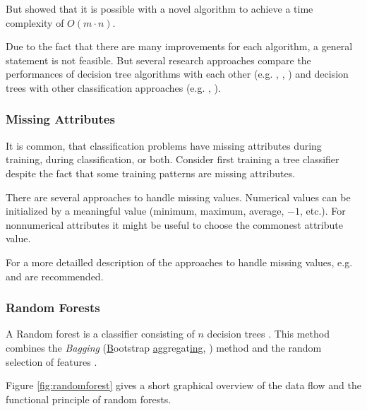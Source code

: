 But \cite{su2006fast} showed that it is possible with a novel algorithm to achieve a time complexity of $O(m \cdot n)$.  


Due to the fact that there are many improvements for each algorithm, a general statement is not feasible. But several research approaches compare the performances of decision tree algorithms with each other (e.g. \cite{lavanya2011performance}, \cite{banfield2007comparison}, \cite{safavian1991survey}) and decision trees with other classification approaches (e.g. \cite{huang2003comparing}, \cite{curram1994neural}). 



\subsubsection{Missing Attributes}

It is common, that classification problems have missing attributes during training, during classification, or both. Consider first training a tree classifier despite the fact that some training patterns are missing attributes. 

There are several approaches to handle missing values. Numerical values can be initialized by a meaningful value (minimum, maximum, average, $-1$, etc.). For nonnumerical attributes it might be useful to choose the commonest attribute value. 

For a more detailled description of the approaches to handle missing values, e.g. \cite{zhang2005missing} and \cite[p. 59 ff.]{rokach2008data} are recommended.


\subsubsection{Random Forests}

A Random forest is a classifier consisting of $n$ decision trees \cite{tong2003decision}. This method combines the \textit{Bagging} (\underline{B}ootstrap \underline{agg}regat\underline{ing}, \cite[p. 105ff.]{rokach2008data}) method and the random selection of features \cite[p. 87 ff.]{rokach2008data}. 

Figure \ref{fig:randomforest} gives a short graphical overview of the data flow and the functional principle of random forests.
 

